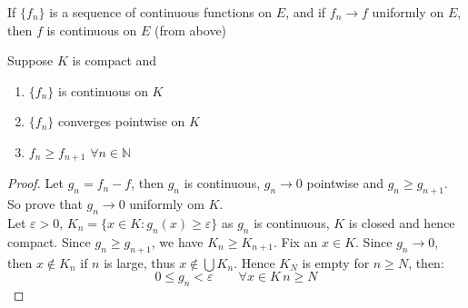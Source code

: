\documentclass{article}
\newcommand{\N}{\mathbb{N}}
\newcommand{\e}{\varepsilon}
\begin{document}
\noindent\begin{theorem}{}{}
   If $\{f_n\}$ is a sequence of continuous functions on $E$, and if $f_n \to f$ uniformly on $E$, then $f$ is continuous on $E$ (from above)
\end{theorem}\vspace{10pt}

\noindent\begin{theorem}{}{}
   Suppose $K$ is compact and
   \begin{enumerate}
     \item $\{f_n\}$ is continuous on $K$
     \item $\{f_n\}$ converges pointwise on $K$
     \item $f_n \geq f_{n+1}$ $\forall n\in \N$
   \end{enumerate}
\end{theorem}\vspace{10pt}

\begin{proof}
  Let $g_n = f_n - f$, then $g_n$ is continuous, $g_n\to 0$ pointwise and $g_n \geq g_{n+1}$. So prove that $g_n\to 0$ uniformly om $K$.\\

  Let $\e > 0$, $K_n = \{ x\in K : g_n(x) \geq \e \}$ as $g_n$ is continuous, $K$ is closed and hence compact. Since $g_n \geq g_{n+1}$, we have $K_n \geq K_{n+1}$. Fix an $x\in K$. Since $g_n\to 0$, then $x\notin K_n$ if $n$ is large, thus $x\notin \bigcup K_n$. Hence $K_N$ is empty for $n \geq N$, then:
  $$ 0 \le g_n < \e \qquad \forall x\in K\, n \geq N $$
\end{proof}
\end{document}
